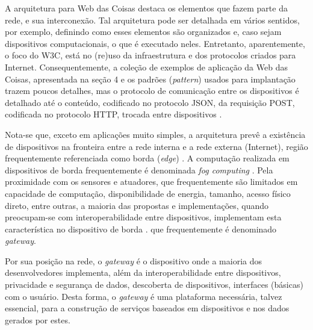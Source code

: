 





A arquitetura para Web das Coisas \cite{Matsukura:23:WTA} destaca os elementos que fazem parte da rede, e sua interconexão. Tal arquitetura pode ser detalhada em vários sentidos, por exemplo, definindo como esses elementos são organizados e, caso sejam dispositivos computacionais, o que é executado neles. Entretanto, aparentemente, o foco do W3C, está no (re)uso da infraestrutura e dos protocolos criados para Internet. Consequentemente, a coleção de exemplos de aplicação da Web das Coisas, apresentada na seção 4 e os padrões (\textit{pattern}) usados para implantação trazem poucos detalhes, mas o protocolo de comunicação entre os dispositivos é detalhado até o conteúdo, codificado no protocolo JSON, da requisição POST, codificada no protocolo HTTP, trocada entre dispositivos \cite{McCool:23:WTT}.

Nota-se que, exceto em aplicações muito simples, a arquitetura prevê a existência de dispositivos na fronteira entre a rede interna e a rede externa (Internet), região frequentemente referenciada como borda (\textit{edge}) \cite{EdgeComputing}. A computação realizada em dispositivos de borda frequentemente é denominada \textit{fog computing} \cite{FogComputing}. Pela proximidade com os sensores e atuadores, que frequentemente são limitados em capacidade de computação, disponibilidade de energia, tamanho, acesso físico direto, entre outras, a maioria das propostas e implementações, quando preocupam-se com interoperabilidade entre dispositivos, implementam esta característica no dispositivo de borda \cite{Stirbu2008} \cite{Gyrard2017}. \cite{GARCIAMANGAS2019235} que frequentemente é denominado \textit{gateway}. 

Por sua posição na rede, o \textit{gateway} é o dispositivo onde a maioria dos desenvolvedores implementa, além da interoperabilidade entre dispositivos, privacidade e segurança de dados, descoberta de dispositivos, interfaces (básicas) com o usuário. Desta forma, o \textit{gateway} é uma plataforma necessária, talvez essencial, para a construção de serviços baseados em dispositivos e nos dados gerados por estes.

